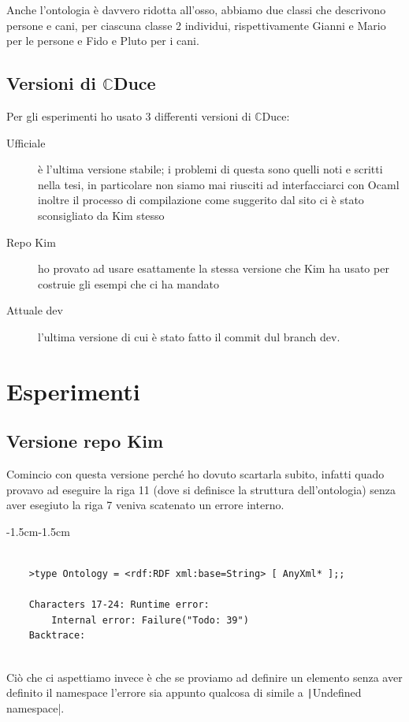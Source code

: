 \documentclass[]{article}
\newcommand{\cduce}{$\mathbb {C}$Duce\xspace}
\begin{document}
Anche l'ontologia è davvero ridotta all'osso, abbiamo due classi che descrivono persone e cani, per ciascuna classe 2 individui, rispettivamente Gianni e Mario per le persone e Fido e Pluto per i cani.

\subsection{Versioni di \cduce}
Per gli esperimenti ho usato 3 differenti versioni di \cduce:
\begin{description}
	\item[Ufficiale]  è l'ultima versione stabile; i problemi di questa sono quelli noti e scritti nella tesi, in particolare non siamo mai riusciti ad interfacciarci con Ocaml inoltre il processo di compilazione come suggerito dal sito ci è stato sconsigliato da Kim stesso
	\item[Repo Kim] ho provato ad usare esattamente la stessa versione che Kim ha usato per costruie gli esempi che ci ha mandato
	\item[Attuale dev] l'ultima versione di cui è stato fatto il commit dul branch dev.
\end{description}

\section{Esperimenti}

\subsection{Versione repo Kim}
Comincio con questa versione perché ho dovuto scartarla subito, infatti quado provavo ad eseguire la riga 11 (dove si definisce la struttura dell'ontologia) senza aver esegiuto la riga 7 veniva scatenato un errore interno.

\begin{adjustwidth}{-1.5cm}{-1.5cm}	
	\begin{minipage}{\linewidth} 
		\begin{verbatim}
	
	>type Ontology = <rdf:RDF xml:base=String> [ AnyXml* ];;
	
	Characters 17-24: Runtime error:
		Internal error: Failure("Todo: 39")
	Backtrace:
	
		\end{verbatim}
	\end{minipage}
\end{adjustwidth}
Ciò che ci aspettiamo invece è che se proviamo ad definire un elemento senza aver definito il namespace l'errore sia appunto qualcosa di simile a \texttt|Undefined namespace|. 
\end{document}
